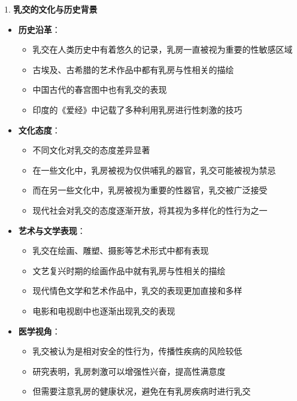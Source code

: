 \documentclass[12pt,UTF8]{ctexbook}
\begin{document}
1. \textbf{乳交的文化与历史背景}
\begin{itemize}
	\item \textbf{历史沿革}：
	\begin{itemize}
		\item 乳交在人类历史中有着悠久的记录，乳房一直被视为重要的性敏感区域
		\item 古埃及、古希腊的艺术作品中都有乳房与性相关的描绘
		\item 中国古代的春宫图中也有乳交的表现
		\item 印度的《爱经》中记载了多种利用乳房进行性刺激的技巧
	\end{itemize}
	\item \textbf{文化态度}：
	\begin{itemize}
		\item 不同文化对乳交的态度差异显著
		\item 在一些文化中，乳房被视为仅供哺乳的器官，乳交可能被视为禁忌
		\item 而在另一些文化中，乳房被视为重要的性器官，乳交被广泛接受
		\item 现代社会对乳交的态度逐渐开放，将其视为多样化的性行为之一
	\end{itemize}
	\item \textbf{艺术与文学表现}：
	\begin{itemize}
		\item 乳交在绘画、雕塑、摄影等艺术形式中都有表现
		\item 文艺复兴时期的绘画作品中就有乳房与性相关的描绘
		\item 现代情色文学和艺术作品中，乳交的表现更加直接和多样
		\item 电影和电视剧中也逐渐出现乳交的表现
	\end{itemize}
	\item \textbf{医学视角}：
	\begin{itemize}
		\item 乳交被认为是相对安全的性行为，传播性疾病的风险较低
		\item 研究表明，乳房刺激可以增强性兴奋，提高性满意度
		\item 但需要注意乳房的健康状况，避免在有乳房疾病时进行乳交
	\end{itemize}
\end{itemize}
\end{document}

